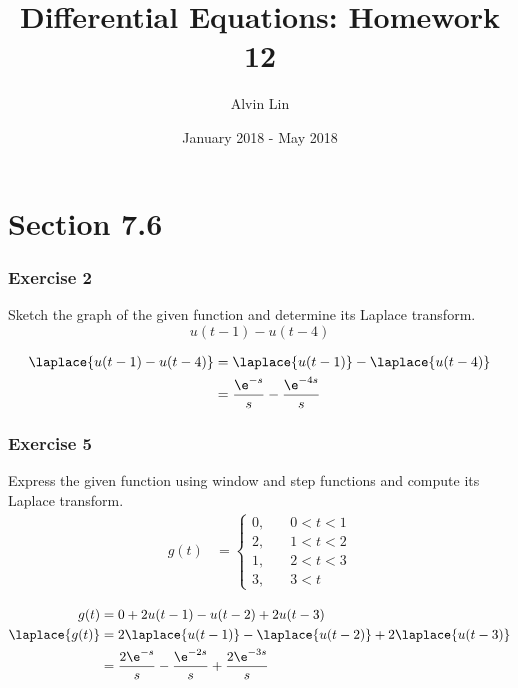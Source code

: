 \documentclass{math}
\title{Differential Equations: Homework 12}
\author{Alvin Lin}
\date{January 2018 - May 2018}
\begin{document}
\maketitle
\clearpage

\section*{Section 7.6}

\subsubsection*{Exercise 2}
Sketch the graph of the given function and determine its Laplace transform.
\[ u(t-1)-u(t-4) \]
\begin{center}
\end{center}
\begin{align*}
  \laplace{u(t-1)-u(t-4)} &= \laplace{u(t-1)}-\laplace{u(t-4)} \\
  &= \frac{\e^{-s}}{s}-\frac{\e^{-4s}}{s}
\end{align*}

\subsubsection*{Exercise 5}
Express the given function using window and step functions and compute its
Laplace transform.
\begin{align*}
  g(t) &= \begin{cases}
    0, &\quad 0<t<1 \\
    2, &\quad 1<t<2 \\
    1, &\quad 2<t<3 \\
    3, &\quad 3<t
  \end{cases}
\end{align*}
\begin{center}
\end{center}
\begin{align*}
  g(t) &= 0+2u(t-1)-u(t-2)+2u(t-3) \\
  \laplace{g(t)} &= 2\laplace{u(t-1)}-\laplace{u(t-2)}+2\laplace{u(t-3)} \\
  &= \frac{2\e^{-s}}{s}-\frac{\e^{-2s}}{s}+\frac{2\e^{-3s}}{s}
\end{align*}
\end{document}
